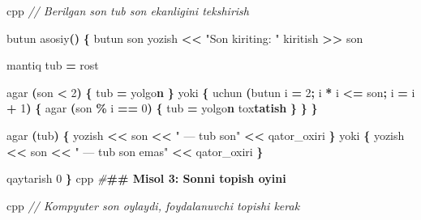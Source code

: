 \documentclass[a4paper,11pt,twoside,openright]{book}
\newenvironment{Shaded}{\begin{snugshade}}{\end{snugshade}}
\newcommand{\CharTok}[1]{\textcolor[rgb]{0.31,0.60,0.02}{#1}}
\newcommand{\CommentTok}[1]{\textcolor[rgb]{0.56,0.35,0.01}{\textit{#1}}}
\newcommand{\DecValTok}[1]{\textcolor[rgb]{0.00,0.00,0.81}{#1}}
\newcommand{\ErrorTok}[1]{\textcolor[rgb]{0.64,0.00,0.00}{\textbf{#1}}}
\newcommand{\NormalTok}[1]{#1}
\newcommand{\OperatorTok}[1]{\textcolor[rgb]{0.81,0.36,0.00}{\textbf{#1}}}
\newcommand{\PreprocessorTok}[1]{\textcolor[rgb]{0.56,0.35,0.01}{\textit{#1}}}
\newcommand{\StringTok}[1]{\textcolor[rgb]{0.31,0.60,0.02}{#1}}
\begin{document}
\begin{Shaded}
\begin{Highlighting}[]
\ErrorTok{\textasciigrave{}\textasciigrave{}\textasciigrave{}}\NormalTok{cpp}
\CommentTok{// Berilgan son tub son ekanligini tekshirish}

\NormalTok{butun asosiy}\OperatorTok{()} \OperatorTok{\{}
\NormalTok{    butun son}
\NormalTok{    yozish }\OperatorTok{\textless{}\textless{}} \StringTok{"Son kiriting: "}
\NormalTok{    kiritish }\OperatorTok{\textgreater{}\textgreater{}}\NormalTok{ son}

\NormalTok{    mantiq tub }\OperatorTok{=}\NormalTok{ rost}

\NormalTok{    agar }\OperatorTok{(}\NormalTok{son }\OperatorTok{\textless{}} \DecValTok{2}\OperatorTok{)} \OperatorTok{\{}
\NormalTok{        tub }\OperatorTok{=}\NormalTok{ yolg}\CharTok{\textquotesingle{}o}\ErrorTok{n}
    \OperatorTok{\}}\NormalTok{ yoki }\OperatorTok{\{}
\NormalTok{        uchun }\OperatorTok{(}\NormalTok{butun i }\OperatorTok{=} \DecValTok{2}\OperatorTok{;}\NormalTok{ i }\OperatorTok{*}\NormalTok{ i }\OperatorTok{\textless{}=}\NormalTok{ son}\OperatorTok{;}\NormalTok{ i }\OperatorTok{=}\NormalTok{ i }\OperatorTok{+} \DecValTok{1}\OperatorTok{)} \OperatorTok{\{}
\NormalTok{            agar }\OperatorTok{(}\NormalTok{son }\OperatorTok{\%}\NormalTok{ i }\OperatorTok{==} \DecValTok{0}\OperatorTok{)} \OperatorTok{\{}
\NormalTok{                tub }\OperatorTok{=}\NormalTok{ yolg}\CharTok{\textquotesingle{}o}\ErrorTok{n}
\NormalTok{                to}\CharTok{\textquotesingle{}x}\ErrorTok{tatish}
            \OperatorTok{\}}
        \OperatorTok{\}}
    \OperatorTok{\}}

\NormalTok{    agar }\OperatorTok{(}\NormalTok{tub}\OperatorTok{)} \OperatorTok{\{}
\NormalTok{        yozish }\OperatorTok{\textless{}\textless{}}\NormalTok{ son }\OperatorTok{\textless{}\textless{}} \StringTok{" — tub son"} \OperatorTok{\textless{}\textless{}}\NormalTok{ qator\_oxiri}
    \OperatorTok{\}}\NormalTok{ yoki }\OperatorTok{\{}
\NormalTok{        yozish }\OperatorTok{\textless{}\textless{}}\NormalTok{ son }\OperatorTok{\textless{}\textless{}} \StringTok{" — tub son emas"} \OperatorTok{\textless{}\textless{}}\NormalTok{ qator\_oxiri}
    \OperatorTok{\}}

\NormalTok{    qaytarish }\DecValTok{0}
\OperatorTok{\}}
\ErrorTok{\textasciigrave{}\textasciigrave{}\textasciigrave{}}\NormalTok{cpp}
\PreprocessorTok{\#}\ErrorTok{\#\# Misol 3: Sonni topish o\textquotesingle{}yini}

\ErrorTok{\textasciigrave{}\textasciigrave{}\textasciigrave{}}\NormalTok{cpp}
\CommentTok{// Kompyuter son o\textquotesingle{}ylaydi, foydalanuvchi topishi kerak}


\end{Highlighting}
\end{Shaded}
\end{document}
